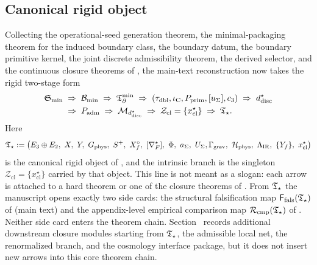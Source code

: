 \subsection{Canonical rigid object}

Collecting the operational-seed generation theorem, the minimal-packaging theorem for the induced
boundary class, the boundary datum, the
boundary primitive kernel, the joint discrete admissibility theorem, the derived selector, and the continuous closure
theorems of
, the main-text reconstruction now takes the rigid two-stage form
\begin{equation}
\label{eq:closed-output-chain}
\begin{aligned}
\mathfrak S_{\min}
&\;\Rightarrow\;
\mathcal B_{\min}
\;\Rightarrow\;
\mathfrak T_{\partial}^{\min}
\;\Rightarrow\;
(\tau_{\mathrm{dbl}},\iota_{\mathrm C},P_{\mathrm{prim}},[u_\Sigma],c_3)
\;\Rightarrow\;
d^\star_{\mathrm{disc}}
\\
&\;\Rightarrow\;
P_{\mathrm{adm}}
\;\Rightarrow\;
\mathcal M_{d^\star_{\mathrm{disc}}}
\;\Rightarrow\;
\mathcal Z_{\mathrm{cl}}=\{x^\star_{\mathrm{cl}}\}
\;\Rightarrow\;
\mathfrak T_{\star}.
\end{aligned}
\end{equation}
Here
\[
\Tstar
:=
\bigl(
E_3\oplus E_2,\ X,\ Y,\ G_{\mathrm{phys}},\ S^+,\ X_f^\circ,\ [\nabla_F^\star],\ \Phi,\ a_\Sigma,\ U_\Sigma,\\
\Gamma_{\mathrm{grav}},\ \mathcal H_{\mathrm{phys}},\ \Lambda_{\mathrm{IR}},\ \{Y_f\},\ x_{\mathrm{cl}}^\star
\bigr)
\]
is the canonical rigid object of , and the intrinsic branch is
the singleton $\mathcal Z_{\mathrm{cl}}=\{x_{\mathrm{cl}}^\star\}$ carried by that object.
This line is not meant as a slogan: each arrow is attached to a hard theorem or one of the
closure theorems of . From $\mathfrak T_{\star}$ the manuscript opens exactly two
side cards: the structural falsification map $\mathsf F_{\mathrm{fals}}(\mathfrak T_{\star})$ of
 (main text) and the appendix-level empirical comparison
map $\mathcal R_{\mathrm{cmp}}(\mathfrak T_{\star})$ of . Neither side card enters the
theorem chain.
Section~ records additional downstream closure modules starting
from $\mathfrak T_{\star}$, the admissible local net, the renormalized branch, and the cosmology interface
package, but it does not insert new arrows into this core theorem chain.


